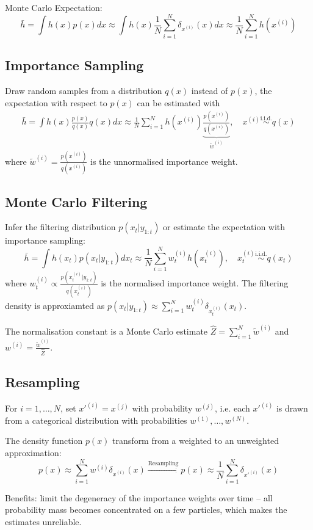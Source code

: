 \documentclass[12pt]{article}
\begin{document}
Monte Carlo Expectation:
$$
\bar{h} = \int h(x) p(x) dx \approx \int h(x)  \frac{1}{N} \sum_{i=1}^N \delta_{x^{(i)}}(x) dx \approx \frac{1}{N} \sum_{i=1}^N h(x^{(i)})
$$

\subsection*{Importance Sampling}
Draw random samples from a distribution $q(x)$ instead of $p(x)$, the expectation with respect to $p(x)$ can be estimated with
\begin{align*}
    \bar{h} = \int h(x)\frac{p(x)}{q(x)} q(x) dx \approx \frac{1}{N} \sum_{i=1}^N h(x^{(i)}) \underbrace{\frac{p(x^{(i)})}{q(x^{(i)})}}_{\tilde{w}^{(i)}}, \quad x^{(i)} \overset{\text{i.i.d.}}{\sim} q(x)
\end{align*}
where $\tilde{w}^{(i)} = \frac{p(x^{(i)})}{q(x^{(i)})}$ is the unnormalised importance weight.

\subsection*{Monte Carlo Filtering}
Infer the filtering distribution $p(x_t | y_{1:t})$ or estimate the expectation with importance sampling:
$$
\bar{h} = \int h(x_t) p(x_t | y_{1:t}) dx_t \approx \frac{1}{N} \sum_{i=1}^N w_t^{(i)} h(x_t^{(i)}), \quad x_t^{(i)} \overset{\text{i.i.d.}}{\sim} q(x_t)
$$
where $w_t^{(i)} \propto \frac{p(x_t^{(i)} | y_{1:t})}{q(x_t^{(i)})}$ is the normalised importance weight. The filtering density is approxiamted as $p(x_t | y_{1:t}) \approx \sum_{i=1}^N w_t^{(i)} \delta_{x_t^{(i)}}(x_t)$.

The normalisation constant is a Monte Carlo estimate $\hat{Z} = \sum_{i=1}^{N}\tilde{w}^{(i)}$ and $w^{(i)} = \frac{\tilde{w}^{(i)}}{\hat{Z}}$.

\subsection*{Resampling}
For $i = 1, \dots, N$, set $x'^{(i)} = x^{(j)}$ with probability $w^{(j)}$, i.e. each $x'^{(i)}$ is drawn from a categorical distribution with probabilities $w^{(1)}, \dots, w^{(N)}$.

The density function $p(x)$ transform from a weighted to an unweighted approximation:
$$
p(x) \approx \sum_{i=1}^N w^{(i)} \delta_{x^{(i)}}(x) \xrightarrow{\text{Resampling}} p(x) \approx \frac{1}{N} \sum_{i=1}^N \delta_{x'^{(i)}}(x)
$$

Benefits: limit the degeneracy of the importance weights over time -- all probability mass becomes concentrated on a few particles, which makes the estimates unreliable.
\end{document}
